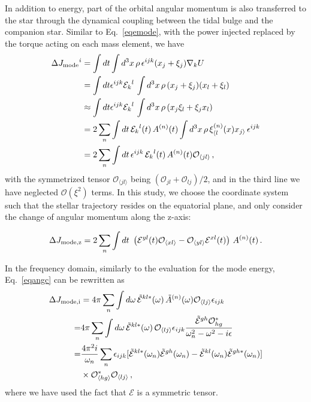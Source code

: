 \documentclass[prd,aps,floatfix,superscriptaddress,nofootinbib,twocolumn,10pt,English]{revtex4}
\begin{document}
In addition to energy, part of the orbital angular momentum is also
transferred to the star through the dynamical coupling between the
tidal bulge and the companion star. Similar to Eq.~\eqref{eqemode}, with the power injected replaced by the torque acting on each mass element, we have 
\begin{align}\label{eqangc}
\Delta {J_{\rm mode }}^i  &= \int dt \int d^3 x \, \rho\,\epsilon^{ijk} (x_j+\xi_j) \nabla_k U\,\nonumber \\
& = \int dt \epsilon^{ijk} {\mathcal{E}_{k}}^l\,\int d^3 x\,\rho\, (x_j+\xi_j)(x_l+\xi_l) \nonumber \\
&\approx \int dt \epsilon^{ijk} {\mathcal{E}_{k}}^l\,\int d^3 x\,\rho\, (x_j \xi_l+\xi_j x_l) \nonumber \\
& =2\sum_n \int dt\, {\mathcal{E}_{k}}^l(t)\, A^{(n)}(t) \int d^3 x\, \rho\, \xi^{(n)}_{\langle l}(x) x_{j\rangle }\, \epsilon^{ijk} \nonumber \\
&=2 \sum_n \int dt\, \epsilon^{ijk}\, {\mathcal{E}_{k}}^l(t)\, A^{(n)}(t) \mathcal{O}_{\langle jl \rangle} \,,
\end{align}
with the symmetrized tensor $\mathcal{O}_{\langle jl \rangle}$ being $(\mathcal{O}_{jl}+\mathcal{O}_{lj})/2$, and in the third line we have neglected $\mathcal{O}(\xi^2)$ terms. In this study, we choose the coordinate system such that the stellar trajectory resides on the equatorial plane, and only  consider the change of angular momentum along the z-axis:

\begin{align}
\Delta J_{\rm mode,z} = 2\sum_n \int dt\, \,\left( \mathcal{E}^{y l}(t) \mathcal{O}_{\langle x l \rangle}-\mathcal{O}_{\langle y l \rangle} \mathcal{E}^{x l}(t)\right)\, A^{(n)}(t) \,.
\end{align}

In the frequency domain, similarly to the evaluation for the mode energy, Eq.~\eqref{eqangc} can be rewritten as
 \begin{align}
\Delta J_{\rm mode, i} & = 4 \pi \sum_n \int d\omega\, {\tilde{\mathcal{E}}^{kl *}}(\omega)\, \tilde{A}^{(n)}(\omega)\mathcal{O}_{\langle lj \rangle} \epsilon_{ijk} \nonumber \\
 =& 4 \pi \sum_n \int d \omega \, {\tilde{\mathcal{E}}^{kl *}}(\omega)\, \mathcal{O}_{\langle lj \rangle} \epsilon_{ijk}\frac{ \tilde{\mathcal{E}}^{gh } \mathcal{O}^*_{hg} }{\omega^2_n-\omega^2-i\epsilon}\,\nonumber \\
=& \frac{4 \pi^2 i}{\omega_n} \sum_n \epsilon_{ijk} [\tilde{\mathcal{E}}^{kl*}(\omega_n)\tilde{\mathcal{E}}^{gh } (\omega_n) -\tilde{\mathcal{E}}^{kl}(\omega_n)\tilde{\mathcal{E}}^{gh*} (\omega_n)]\nonumber \\
&\times \mathcal{O}^*_{\langle hg \rangle} \mathcal{O}_{\langle lj \rangle}\,,
\end{align}
where we have used the fact that $\mathcal{E}$ is a symmetric tensor.
\end{document}
